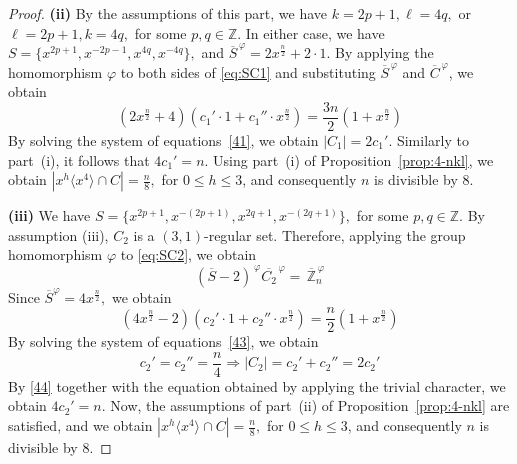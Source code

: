 \documentclass[12pt]{article}
\begin{document}
\begin{proof}
\indent\textbf{(ii)} By the assumptions of this part, we have
$
k=2p+1, \ell=4q,
$
or
$
\ell=2p+1, k=4q,
$
for some \(p,q\in\mathbb{Z}\). In either case, we have
$
S=\{x^{2p+1},x^{-2p-1},x^{4q},x^{-4q}\},
$
and
$
\overline{S}^{\,\varphi}=2x^{\frac{n}{2}}+2 \cdot 1.
$ By applying the homomorphism $\varphi$ to both sides of \eqref{eq:SC1} and substituting $\overline{S}^{\,\varphi}$ and $\overline{C}^{\,\varphi}$, we obtain
  \begin{equation}\label{41}
	\left(2x^{\frac{n}{2}}+4\right)
	\left(c_1' \cdot 1+c_1''  \cdot x^{\frac{n}{2}}\right)
	=
	\frac{3n}{2}\left(1+x^{\frac{n}{2}}\right)
\end{equation}
By solving the system of equations~\eqref{41}, we obtain
$
|C_1|=2c_1'.
$
Similarly to part~(i), it follows that
$
4c_1'=n.
$ Using part~(i) of Proposition~\ref{prop:4-nkl}, we obtain $
\left|x^{h}\langle x^{4}\rangle\cap C\right|
=\frac{n}{8},
$ for \(0\le h\le 3\), and consequently \(n\) is divisible by \(8\).

 \textbf{(iii)} We have
 $
 S=\{x^{2p+1},x^{-(2p+1)},x^{2q+1},x^{-(2q+1)}\},
 $
 for some \(p,q\in\mathbb{Z}\).
By assumption (iii), $C_2$ is a $(3,1)$-regular set. Therefore, applying the group homomorphism $\varphi$ to \eqref{eq:SC2}, we obtain
\begin{equation}\label{42}
	(\overline{S}-2)^ {\,\varphi}\overline{C_2}^{\,\varphi}=\, \overline{\mathbb{Z}}_n^{\,\varphi}
\end{equation}
Since
$
\overline{S}^{\varphi}=4x^{\frac{n}{2}},
$
we obtain
\begin{equation}\label{43}
	\left(4x^{\frac{n}{2}}-2\right)
	\left(c_2' \cdot 1+c_2''  \cdot x^{\frac{n}{2}}\right)
	=
	\frac{n}{2}\left(1+x^{\frac{n}{2}}\right)
\end{equation}
By solving the system of equations~\eqref{43}, we obtain
\begin{equation}\label{44}
	c_2'=c_2''=\frac{n}{4}
	\Longrightarrow
	|C_2|=c_2'+c_2''=2c_2'	
\end{equation}
By \eqref{44} together with the equation obtained by applying the trivial character, we obtain
$
4c_2'=n.
$ Now, the assumptions of part~(ii) of Proposition~\ref{prop:4-nkl} are satisfied, and we obtain $
\left|x^{h}\langle x^{4}\rangle\cap C\right|
=\frac{n}{8},
$ for \(0\le h\le 3\), and consequently \(n\) is divisible by \(8\).


\end{proof}
\end{document}
